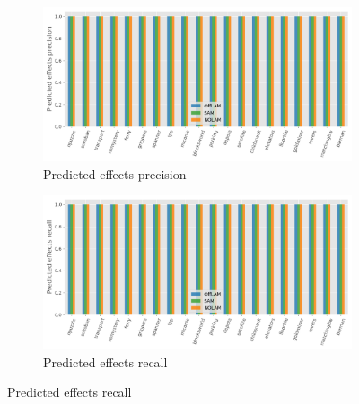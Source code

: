 \begin{figure}[htbp]
  \begin{subfigure}[b]{0.45\textwidth}
    \includegraphics[width=\textwidth]{figures/predeffs_precision.png}
    \caption{Predicted effects precision}
  \end{subfigure}
  \hfill
  \begin{subfigure}[b]{0.45\textwidth}
    \includegraphics[width=\textwidth]{figures/predeffs_recall.png}
    \caption{Predicted effects recall}
  \end{subfigure}

  \vspace{1em}


\end{figure}
